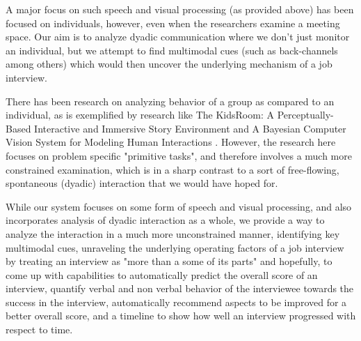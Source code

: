 \documentclass[11pt]{article}
\begin{document}
A major focus on such speech and visual processing (as provided above) has been focused on individuals, however, even when the researchers examine a meeting space. Our aim is to analyze dyadic communication where we don't just monitor an individual, but we attempt to find multimodal cues (such as back-channels among others) which would then uncover the underlying mechanism of a job interview.

There has been research on analyzing behavior of a group as compared to an individual, as is exemplified by research like The KidsRoom: A Perceptually-Based Interactive \cite{bobick1999kidsroom} and Immersive Story Environment and A Bayesian Computer Vision System for Modeling Human Interactions \cite{oliver2000bayesian}. However, the research here focuses on problem specific "primitive tasks", and therefore involves a much more constrained examination, which is in a sharp contrast to a sort of free-flowing, spontaneous (dyadic) interaction that we would have hoped for.

While our system focuses on some form of speech and visual processing, and also incorporates analysis of dyadic interaction as a whole, we provide a way to analyze the interaction in a much more unconstrained manner, identifying key multimodal cues, unraveling the underlying operating factors of a job interview by treating an interview as "more than a some of its parts" and hopefully, to come up with capabilities to automatically predict the overall score of an interview, quantify verbal and non verbal behavior of the interviewee towards the success in the interview, automatically recommend aspects to be improved for a better overall score, and a timeline to show how well an interview progressed with respect to time.
\end{document}
